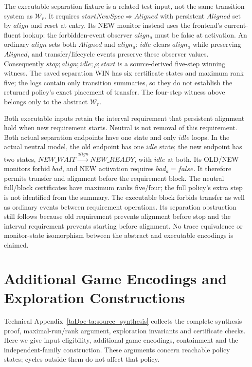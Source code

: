 \documentclass[11pt]{article}
\begin{document}
The executable separation fixture is a related test input, not the same transition system as $\mathcal W_r$. It requires $startNewSpec\Rightarrow Aligned$ with persistent $Aligned$ set by $align$ and reset at entry. Its NEW monitor instead uses the frontend's current-fluent lookup: the forbidden-event observer $align_a$ must be false at activation. An ordinary $align$ sets both $Aligned$ and $align_a$; $idle$ clears $align_a$ while preserving $Aligned$, and transfer/lifecycle events preserve these observer values. Consequently $stop;align;idle;\rho;start$ is a source-derived five-step winning witness. The saved separation WIN has six certificate states and maximum rank five; the logs contain only transition summaries, so they do not establish the returned policy's exact placement of transfer. The four-step witness above belongs only to the abstract $\mathcal W_r$.

Both executable inputs retain the interval requirement that persistent alignment hold when new requirement starts. Neutral is not removal of this requirement. Both actual separation endpoints have one state and only $idle$ loops. In the actual neutral model, the old endpoint has one $idle$ state; the new endpoint has two states, $NEW\_WAIT\xrightarrow{align}NEW\_READY$, with $idle$ at both. Its OLD/NEW monitors forbid $bad$, and NEW activation requires $bad_a=false$. It therefore permits transfer and alignment before the requirement block. The neutral full/block certificates have maximum ranks five/four; the full policy's extra step is not identified from the summary. The executable block forbids transfer as well as ordinary events between requirement operations. Its separation obstruction still follows because old requirement prevents alignment before stop and the interval requirement prevents starting before alignment. No trace equivalence or monitor-state isomorphism between the abstract and executable encodings is claimed.

\section{Additional Game Encodings and Exploration Constructions}
\label{supp:search}
Technical Appendix~\ref{taDoc-ta:source_synthesis} collects the complete synthesis proof, maximal-run/rank argument, exploration invariants and certificate checks. Here we give input eligibility, additional game encodings, containment and the independent-family construction. These arguments concern reachable policy states; cycles outside them do not affect that policy.
\end{document}
